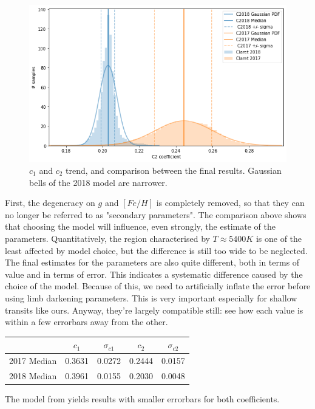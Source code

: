 \documentclass[a4paper,11pt,twocolumn]{article}
\begin{document}
\begin{figure}[H]
    \includegraphics[scale=0.35, angle=0]{../pictures/ClaretvClaret/c2_comp.png}
    \caption{$c_1$ and $c_2$ trend, and comparison between the final results. Gaussian bells of the 2018 model are narrower.}
\end{figure}
First, the degeneracy on $g$ and $[Fe/H]$ is completely removed, so that they 
can no longer be referred to as "secondary parameters". The comparison above shows 
that choosing the model will influence, even strongly, the estimate of 
the parameters. Quantitatively, the region characterised by $T\approx5400 K$
is one of the least affected by model choice, but the difference is still 
too wide to be neglected.
The final estimates for the parameters are also quite different, both in 
terms of value and in terms of error. This indicates a systematic difference 
caused by the choice of the model. Because of this, we need to artificially 
inflate the error before using limb darkening parameters. This is very 
important especially for shallow transits like ours.
Anyway, they're largely compatible still: see how each value is within a 
few errorbars away from the other.
\begin{table}[h!]
	\centering
	\begin{tabular}{ccccc}
		\hline
		& $c_1$ & $\sigma_{c1}$ & $c_2$ & $\sigma_{c2}$\\
		\hline
		2017 Median & 0.3631 & 0.0272 & 0.2444 & 0.0157 \\
		2018 Median & 0.3961 & 0.0155 & 0.2030 & 0.0048 \\
		\hline
	\end{tabular} 
\end{table}
The model from \cite{claret2018} yields results with 
smaller errorbars for both coefficients.
\end{document}
